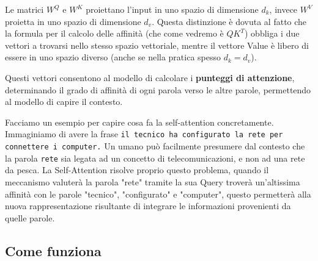 \documentclass{article}
\begin{document}
Le matrici $W^Q$ e $W^K$ proiettano l'input in uno spazio di dimensione $d_k$, invece $W^V$ proietta in uno spazio di dimensione $d_v$.
Questa distinzione è dovuta al fatto che la formula per il calcolo delle affinità (che come vedremo è $QK^T$) obbliga i due vettori a trovarsi nello stesso spazio vettoriale,
mentre il vettore Value è libero di essere in uno spazio diverso (anche se nella pratica spesso $d_k=d_v$).



Questi vettori consentono al modello di calcolare i \textbf{punteggi di attenzione}, determinando il grado di affinità di ogni parola verso le altre parole, permettendo al modello di capire il contesto.

Facciamo un esempio per capire cosa fa la self-attention concretamente.
Immaginiamo di avere la frase \newline
\texttt{il tecnico ha configurato la rete per connettere i computer.} \newline
Un umano può facilmente presumere dal contesto che la parola \texttt{rete} sia legata ad un concetto di telecomunicazioni, e non ad una rete da pesca.
La Self-Attention risolve proprio questo problema, quando il meccanismo valuterà la parola "rete" tramite la sua Query troverà un'altissima affinità con le parole "tecnico", "configurato" e "computer",
questo permetterà alla nuova rappresentazione risultante di integrare le informazioni provenienti da quelle parole.

\subsection{Come funziona}
\label{sec:formula-attention}
\end{document}
